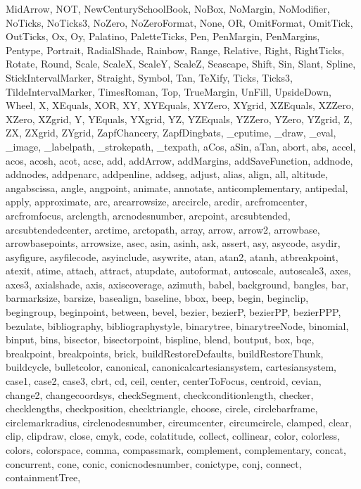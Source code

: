 {{  MidArrow, NOT, NewCenturySchoolBook, NoBox, NoMargin, NoModifier, NoTicks,
  NoTicks3, NoZero, NoZeroFormat, None, OR, OmitFormat, OmitTick, OutTicks,
  Ox, Oy, Palatino, PaletteTicks, Pen, PenMargin, PenMargins, Pentype,
  Portrait, RadialShade, Rainbow, Range, Relative, Right, RightTicks, Rotate,
  Round, Scale, ScaleX, ScaleY, ScaleZ, Seascape, Shift, Sin, Slant, Spline,
  StickIntervalMarker, Straight, Symbol, Tan, TeXify, Ticks, Ticks3,
  TildeIntervalMarker, TimesRoman, Top, TrueMargin, UnFill, UpsideDown,
  Wheel, X, XEquals, XOR, XY, XYEquals, XYZero, XYgrid, XZEquals, XZZero,
  XZero, XZgrid, Y, YEquals, YXgrid, YZ, YZEquals, YZZero, YZero, YZgrid, Z,
  ZX, ZXgrid, ZYgrid, ZapfChancery, ZapfDingbats, _cputime, _draw, _eval,
  _image, _labelpath, _strokepath, _texpath, aCos, aSin, aTan, abort, abs,
  accel, acos, acosh, acot, acsc, add, addArrow, addMargins, addSaveFunction,
  addnode, addnodes, addpenarc, addpenline, addseg, adjust, alias, align,
  all, altitude, angabscissa, angle, angpoint, animate, annotate,
  anticomplementary, antipedal, apply, approximate, arc, arcarrowsize,
  arccircle, arcdir, arcfromcenter, arcfromfocus, arclength, arcnodesnumber,
  arcpoint, arcsubtended, arcsubtendedcenter, arctime, arctopath, array,
  arrow, arrow2, arrowbase, arrowbasepoints, arrowsize, asec, asin, asinh,
  ask, assert, asy, asycode, asydir, asyfigure, asyfilecode, asyinclude,
  asywrite, atan, atan2, atanh, atbreakpoint, atexit, atime, attach, attract,
  atupdate, autoformat, autoscale, autoscale3, axes, axes3, axialshade, axis,
  axiscoverage, azimuth, babel, background, bangles, bar, barmarksize,
  barsize, basealign, baseline, bbox, beep, begin, beginclip, begingroup,
  beginpoint, between, bevel, bezier, bezierP, bezierPP, bezierPPP, bezulate,
  bibliography, bibliographystyle, binarytree, binarytreeNode, binomial,
  binput, bins, bisector, bisectorpoint, bispline, blend, boutput, box, bqe,
  breakpoint, breakpoints, brick, buildRestoreDefaults, buildRestoreThunk,
  buildcycle, bulletcolor, canonical, canonicalcartesiansystem,
  cartesiansystem, case1, case2, case3, cbrt, cd, ceil, center,
  centerToFocus, centroid, cevian, change2, changecoordsys, checkSegment,
  checkconditionlength, checker, checklengths, checkposition, checktriangle,
  choose, circle, circlebarframe, circlemarkradius, circlenodesnumber,
  circumcenter, circumcircle, clamped, clear, clip, clipdraw, close, cmyk,
  code, colatitude, collect, collinear, color, colorless, colors, colorspace,
  comma, compassmark, complement, complementary, concat, concurrent, cone,
  conic, conicnodesnumber, conictype, conj, connect, containmentTree,
}}
